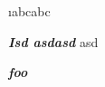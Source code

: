 \documentclass{article}
\begin{document}
\i{abc}abc

\emph{ \textbf {\rm Isd \em asdasd}} {asd}

\emph{\textbf{foo}}
\end{document}
